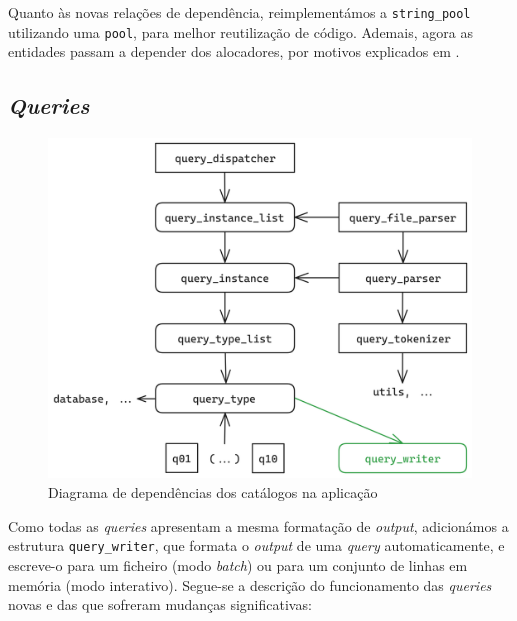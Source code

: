 \documentclass[12pt, a4paper]{article}
\begin{document}
Quanto às novas relações de dependência, reimplementámos a \texttt{string\_pool} utilizando uma
\texttt{pool}, para melhor reutilização de código. Ademais, agora as entidades passam a depender
dos alocadores, por motivos explicados em .

\subsection{\emph{Queries}}
\label{sec:queries}

\begin{figure}[ht]
    \centering
    \includegraphics[scale=0.17]{res-fase2/queries.png}
    \caption{Diagrama de dependências dos catálogos na aplicação}
    \label{fig:queries}
\end{figure}

Como todas as \emph{queries} apresentam a mesma formatação de \emph{output}, adicionámos a estrutura
\texttt{query\_writer}, que formata o \emph{output} de uma \emph{query} automaticamente, e escreve-o
para um ficheiro (modo \emph{batch}) ou para um conjunto de linhas em memória (modo interativo).
Segue-se a descrição do funcionamento das \emph{queries} novas e das que sofreram mudanças
significativas:
\end{document}
